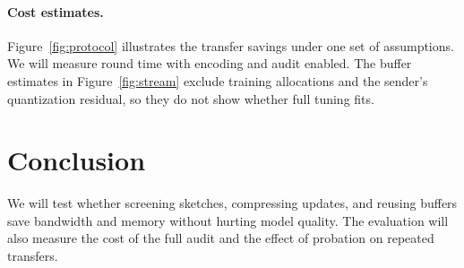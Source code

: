 \documentclass{article}
\begin{document}
\paragraph{Cost estimates.} Figure~\ref{fig:protocol} illustrates the transfer savings under one set of assumptions. We will measure round time with encoding and audit enabled. The buffer estimates in Figure~\ref{fig:stream} exclude training allocations and the sender's quantization residual, so they do not show whether full tuning fits.

\section{Conclusion}

We will test whether screening sketches, compressing updates, and reusing buffers save bandwidth and memory without hurting model quality. The evaluation will also measure the cost of the full audit and the effect of probation on repeated transfers.



\end{document}
